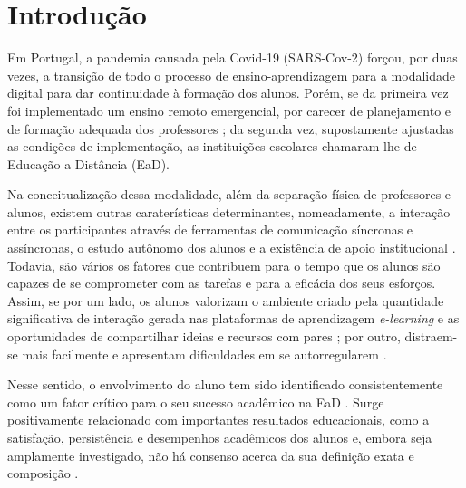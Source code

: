 \documentclass[portuguese]{textolivre}
\begin{document}
\begin{polyabstract}
\begin{english}
\begin{abstract}
\end{abstract}
\end{english}
\end{polyabstract}

\section{Introdução}\label{sec-intro}
Em Portugal, a pandemia causada pela Covid-19 (SARS-Cov-2) forçou, por duas vezes, a transição de todo o processo de ensino-aprendizagem para a modalidade digital para dar continuidade à formação dos alunos. Porém, se da primeira vez foi implementado um ensino remoto emergencial, por carecer de planejamento e de formação adequada dos professores \cite{bozkurt_emergency_2020}; da segunda vez, supostamente ajustadas as condições de implementação, as instituições escolares chamaram-lhe de Educação a Distância (EaD). 

Na conceitualização dessa modalidade, além da separação física de professores e alunos, existem outras caraterísticas determinantes, nomeadamente, a interação entre os participantes através de ferramentas de comunicação síncronas e assíncronas, o estudo autônomo dos alunos e a existência de apoio institucional \cite{espino-diaz_creating_2020}. Todavia, são vários os fatores que contribuem para o tempo que os alunos são capazes de se comprometer com as tarefas e para a eficácia dos seus esforços. Assim, se por um lado, os alunos valorizam o ambiente criado pela quantidade significativa de interação gerada nas plataformas de aprendizagem \textit{e-learning} e as oportunidades de compartilhar ideias e recursos com pares \cite{espino-diaz_creating_2020}; por outro, distraem-se mais facilmente e apresentam dificuldades em se autorregularem \cite{xu_effects_2020}. 

Nesse sentido, o envolvimento do aluno tem sido identificado consistentemente como um fator crítico para o seu sucesso acadêmico na EaD \cite{hampton_student_2016}. Surge positivamente relacionado com importantes resultados educacionais, como a satisfação, persistência e desempenhos acadêmicos dos alunos \cite{kuh_what_2009} e, embora seja amplamente investigado, não há consenso acerca da sua definição exata e composição \cite{eccles_engagement:_2016}.
\end{document}

